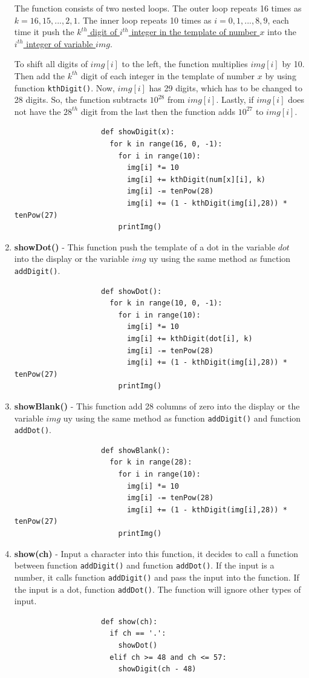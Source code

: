 \documentclass[12pt]{article}
\begin{document}
\begin{enumerate}
			The function consists of two nested loops. The outer loop repeats 16 times as $k = 16, 15, ... ,2 , 1$. The inner loop repeats 10 times as $i = 0, 1, ..., 8, 9$, each time it push the \underline{$k^{th}$ digit of $i^{th}$ integer in the template of number $x$} into the \underline{$i^{th}$ integer of variable $img$}. 

			To shift all digits of $img[i]$ to the left, the function multiplies $img[i]$ by 10. Then add the $k^{th}$ digit of each integer in the template of number $x$ by using function \texttt{kthDigit()}. Now, $img[i]$ has 29 digits, which has to be changed to 28 digits. So, the function subtracts $10^{28}$ from $img[i]$. Lastly, if $img[i]$ does not have the $28^{th}$ digit from the last then the function adds $10^{27}$ to $img[i]$. 
				\begin{verbatim}
					def showDigit(x):
					  for k in range(16, 0, -1):
					    for i in range(10):
					      img[i] *= 10
					      img[i] += kthDigit(num[x][i], k)
					      img[i] -= tenPow(28)
					      img[i] += (1 - kthDigit(img[i],28)) * tenPow(27)
					    printImg()
				\end{verbatim}

			\item \textbf{showDot()} - This function push the template of a dot in the variable $dot$ into the display or the variable $img$ uy using the same method as function \texttt{addDigit()}.
				\begin{verbatim}
					def showDot():
					  for k in range(10, 0, -1):
					    for i in range(10):
					      img[i] *= 10
					      img[i] += kthDigit(dot[i], k)
					      img[i] -= tenPow(28)
					      img[i] += (1 - kthDigit(img[i],28)) * tenPow(27)
					    printImg()
				\end{verbatim}

			\item \textbf{showBlank()} - This function add 28 columns of zero into the display or the variable $img$ uy using the same method as function \texttt{addDigit()} and function \texttt{addDot()}.
				\begin{verbatim}
					def showBlank():
					  for k in range(28):
					    for i in range(10):
					      img[i] *= 10
					      img[i] -= tenPow(28)
					      img[i] += (1 - kthDigit(img[i],28)) * tenPow(27)
					    printImg()
				\end{verbatim}

			\item \textbf{show(ch)} - Input a character into this function, it decides to call a function between function \texttt{addDigit()} and function \texttt{addDot()}. If the input is a number, it calls function \texttt{addDigit()} and pass the input into the function. If the input is a dot, function \texttt{addDot()}. The function will ignore other types of input.
				\begin{verbatim}
					def show(ch):
					  if ch == '.':
					    showDot()
					  elif ch >= 48 and ch <= 57:
					    showDigit(ch - 48)
				\end{verbatim}


\end{enumerate}
\end{document}
